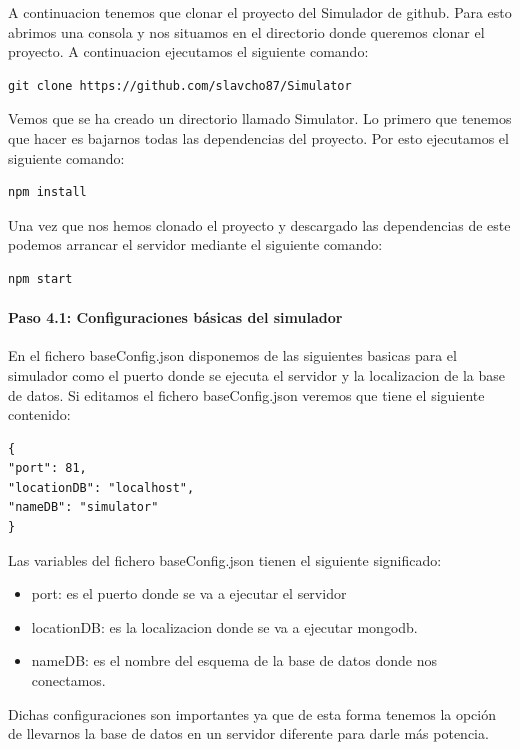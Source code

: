 A continuacion tenemos que clonar el proyecto del Simulador de github. Para esto abrimos una consola y nos situamos en el directorio donde queremos clonar el proyecto. A continuacion ejecutamos el siguiente comando:
\begin{lstlisting}[language=xml, frame=single]
git clone https://github.com/slavcho87/Simulator
\end{lstlisting}
Vemos que se ha creado un directorio llamado Simulator. Lo primero que tenemos que hacer es bajarnos todas las dependencias del proyecto. Por esto ejecutamos el siguiente comando:
\begin{lstlisting}[language=xml, frame=single]
npm install
\end{lstlisting}
Una vez que nos hemos clonado el proyecto y descargado las dependencias de este podemos arrancar el servidor mediante el siguiente comando:
\begin{lstlisting}[language=xml, frame=single]
npm start
\end{lstlisting}

\paragraph{Paso 4.1: Configuraciones básicas del simulador}

En el fichero baseConfig.json disponemos de las siguientes basicas para el simulador como el puerto donde se ejecuta el servidor y la localizacion de la base de datos. Si editamos el fichero baseConfig.json veremos que tiene el siguiente contenido:
\begin{lstlisting}[language=xml, frame=single]
{ 
"port": 81, 
"locationDB": "localhost", 
"nameDB": "simulator" 
}
\end{lstlisting}

Las variables del fichero baseConfig.json tienen el siguiente significado:

\begin{itemize}
	\item port: es el puerto donde se va a ejecutar el servidor
	\item locationDB: es la localizacion donde se va a ejecutar mongodb.
	\item nameDB: es el nombre del esquema de la base de datos donde nos conectamos.
\end{itemize}

Dichas configuraciones son importantes ya que de esta forma tenemos la opción de llevarnos la base de datos en un servidor diferente para darle más potencia.


